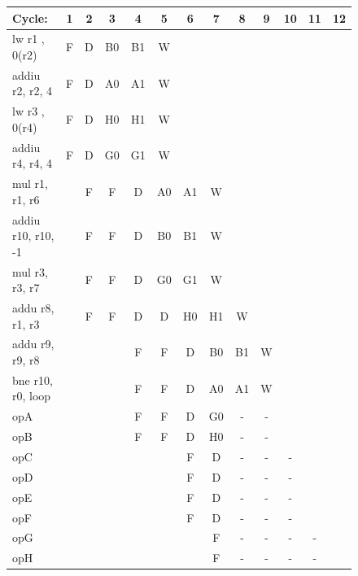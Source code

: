 \documentclass[10pt]{article}
\begin{document}
\begin{figure}[H]
\centering
{\setlength{\tabcolsep}{2pt}
\begin{tabular}{|l|c|c|c|c!{\vrule width 1.5pt}c|c|c|c|c|c|c!{\vrule width 1.5pt}c|}
\hline
Cycle:            & 1  & 2  & 3  & 4  & 5  & 6  & 7  & 8  & 9  & 10 & 11 & 12 \\ \hline
lw r1 , 0(r2)     & F  & D  & B0 & B1 & W  &    &    &    &    &    &    &    \\ \hline
addiu r2, r2, 4   & F  & D  & A0 & A1 & W  &    &    &    &    &    &    &    \\ \hline
lw r3 , 0(r4)     & F  & D  & H0 & H1 & W  &    &    &    &    &    &    &    \\ \hline
addiu r4, r4, 4   & F  & D  & G0 & G1 & W  &    &    &    &    &    &    &    \\ \hline
mul r1, r1, r6    &    & F  & F  & D  & A0 & A1 & W  &    &    &    &    &    \\ \hline
addiu r10, r10, -1&    & F  & F  & D  & B0 & B1 & W  &    &    &    &    &    \\ \hline
mul r3, r3, r7    &    & F  & F  & D  & G0 & G1 & W  &    &    &    &    &    \\ \hline
addu r8, r1, r3   &    & F  & F  & D  & D  & H0 & H1 & W  &    &    &    &    \\ \hline
addu r9, r9, r8   &    &    &    & F  & F  & D  & B0 & B1 & W  &    &    &    \\ \hline
bne r10, r0, loop &    &    &    & F  & F  & D  & A0 & A1 & W  &    &    &    \\ \hline
opA               &    &    &    & F  & F  & D  & G0 & -  & -  &    &    &    \\ \hline
opB               &    &    &    & F  & F  & D  & H0 & -  & -  &    &    &    \\ \hline
opC               &    &    &    &    &    & F  & D  & -  & -  & -  &    &    \\ \hline
opD               &    &    &    &    &    & F  & D  & -  & -  & -  &    &    \\ \hline
opE               &    &    &    &    &    & F  & D  & -  & -  & -  &    &    \\ \hline
opF               &    &    &    &    &    & F  & D  & -  & -  & -  &    &    \\ \hline
opG               &    &    &    &    &    &    & F  & -  & -  & -  & -  &    \\ \hline
opH               &    &    &    &    &    &    & F  & -  & -  & -  & -  &    \\ \hline

\end{tabular}}
\end{figure}
\end{document}
